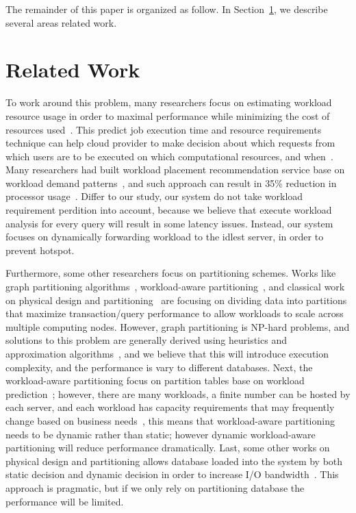 The remainder of this paper is organized as follow. In Section~\ref{sec:relWork}, we describe several areas related work.

\section{Related Work}
\label{sec:relWork}

To work around this problem, many researchers focus on estimating workload resource usage in order to maximal performance while minimizing the cost of resources used~\cite{citeulike:6656217,5452742,curino2011relational, MIT-Relational}. This predict job execution time and resource requirements technique can help cloud provider to make decision about which requests from which users are to be executed on which computational resources, and when~\cite{citeulike:6656217}. Many researchers had built workload placement recommendation service base on workload demand patterns~\cite{Gmach:2007:WAD:1524302.1524818, Atikoglu:2012:WAL:2254756.2254766}, and such approach can result in 35\% reduction in processor usage~\cite{Gmach:2007:WAD:1524302.1524818}. Differ to our study, our system do not take workload requirement perdition into account, because we believe that execute workload analysis for every query will result in some latency issues. Instead, our system focuses on dynamically forwarding workload to the idlest server, in order to prevent hotspot.
 
Furthermore, some other researchers focus on partitioning schemes. Works like graph partitioning algorithms~\cite{Karypis:1998:FHQ:305219.305248}, workload-aware partitioning~\cite{Scholl:2009:WDP:1516360.1516366}, and classical work on physical design and partitioning~\cite{Zilio:1998:PDD:928651} are focusing on dividing data into partitions that maximize transaction/query performance to allow workloads to scale across multiple computing nodes. However, graph partitioning is NP-hard problems, and solutions to this problem are generally derived using heuristics and approximation algorithms~\cite{citeulike:11192678}, and we believe that this will introduce execution complexity, and the performance is vary to different databases. Next, the workload-aware partitioning focus on partition tables base on workload prediction~\cite{Scholl:2009:WDP:1516360.1516366, Mit-Shinobi}; however, there are many workloads, a ﬁnite number can be hosted by each server, and each workload has capacity requirements that may frequently change based on business needs~\cite{Gmach:2007:WAD:1524302.1524818}, this means that workload-aware partitioning needs to be dynamic rather than static; however dynamic workload-aware partitioning will reduce performance dramatically. Last, some other works on physical design and partitioning allows database loaded into the system by both static decision and dynamic decision in order to increase I/O bandwidth~\cite{Zilio:1998:PDD:928651}. This approach is pragmatic, but if we only rely on partitioning database the performance will be limited.
 
